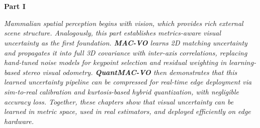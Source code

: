 \chapter*{} %

\begin{center}
    \vspace*{3.5cm} 
{\Huge \textbf{Part I} \\ [1cm]}
{\LARGE \textbf{\partITitle}}
\end{center}

\vspace{2cm}

\begin{center}
\textit{Mammalian spatial perception begins with vision, which provides rich external scene structure. Analogously, this part establishes metrics-aware visual uncertainty as the first foundation. \textbf{MAC-VO} learns 2D matching uncertainty and propagates it into full 3D covariance with inter-axis correlations, replacing hand-tuned noise models for keypoint selection and residual weighting in learning-based stereo visual odometry. \textbf{QuantMAC-VO} then demonstrates that this learned uncertainty pipeline can be compressed for real-time edge deployment via sim-to-real calibration and kurtosis-based hybrid quantization, with negligible accuracy loss. Together, these chapters show that visual uncertainty can be learned in metric space, used in real estimators, and deployed efficiently on edge hardware.}
\end{center}
